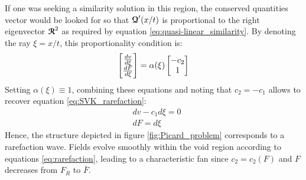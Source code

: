 \begin{remark}
  If one was seeking a similarity solution in this region, the conserved quantities vector would be looked for so that ${\boldsymbol{\mathcal{Q}}}'(x/t)$ is proportional to the right eigenvector ${\boldsymbol{\mathcal{R}}}^2$ as required by equation \eqref{eq:quasi-linear_similarity}. By denoting the ray $\xi=x/t$, this proportionality condition is:
  \begin{equation*}
    \left[\begin{matrix}\frac{d v}{d \xi} \\ \frac{d F}{d \xi}\end{matrix}\right] = \alpha(\xi) \left[\begin{matrix} -c_2 \\ 1\end{matrix}\right]
  \end{equation*}
  Setting $\alpha(\xi)\equiv 1$, combining these equations and noting that $c_2=-c_1$ allows to recover equation \eqref{eq:SVK_rarefaction}:
  \begin{equation}
    \label{eq:rarefaction}
    \begin{aligned}
      & dv -c_1 d\xi = 0\\
      & dF = d\xi
    \end{aligned}
  \end{equation}
Hence, the structure depicted in figure \ref{fig:Picard_problem} corresponds to a rarefaction wave. Fields evolve smoothly within the void region according to equations \eqref{eq:rarefaction}, leading to a characteristic fan since $c_2=c_2(F)$ and $F$ decreases from $F_R$ to $\bar{F}$.
\end{remark}


